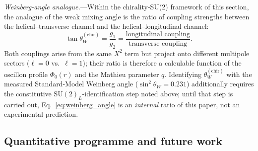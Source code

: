 \documentclass[11pt]{article}
\begin{document}
\textit{Weinberg-angle analogue.}---Within the
chirality-SU(2) framework of this section, the
analogue of the weak mixing angle is the ratio
of coupling strengths between the
helical--transverse channel and the
helical--longitudinal channel:
\begin{equation}\label{eq:weinberg_angle}
  \tan\theta_W^{\mathrm{(chir)}}
  = \frac{g_1}{g_2}
  = \frac{\text{longitudinal coupling}}
  {\text{transverse coupling}}.
\end{equation}
Both couplings arise from the same $X^2$ term
but project onto different multipole sectors
($\ell = 0$ vs.\ $\ell = 1$); their ratio is
therefore a calculable function of the
oscillon profile $\Phi_0(r)$ and the Mathieu
parameter $q$.  Identifying
$\theta_W^{\mathrm{(chir)}}$ with the measured
Standard-Model Weinberg angle ($\sin^2\theta_W
= 0.231$) additionally requires the
constitutive $\mathrm{SU}(2)_L$-identification
step noted above; until that step is carried
out, Eq.~\eqref{eq:weinberg_angle} is an
\emph{internal} ratio of this paper, not an
experimental prediction.

\subsection{Quantitative programme and future
work}
\label{sec:neutrino_future}
\end{document}
